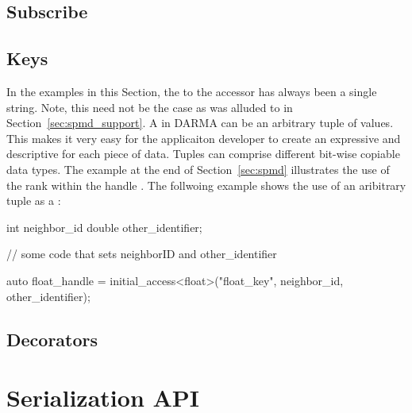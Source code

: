 
\subsection{Subscribe}
\label{subsec:subscribe}

\subsection{Keys}
\label{subsec:keys}
In the examples in this Section, the  to the accessor has always been a
single string.  Note, this need not be the case as was alluded to in
Section~\ref{sec:spmd_support}. A
 in DARMA 
can be an arbitrary \gls{tuple} of values.  This 
makes it very easy for the applicaiton developer to create an expressive
and descriptive  for each piece of data.  Tuples can comprise
different bit-wise copiable data types.  The example at the end of
Section~\ref{sec:spmd} illustrates the use of the \gls{rank} within the handle
.  The follwoing example shows the use of an
aribitrary \gls{tuple} as a :
\begin{CppCode}
  int neighbor_id
  double other_identifier;

  // some code that sets neighborID and other_identifier
  
  auto float_handle = initial_access<float>("float_key", 
                                            neighbor_id, 
                                            other_identifier);
\end{CppCode}



\subsection{Decorators}
\label{subsec:decorators}


\section{Serialization API}
